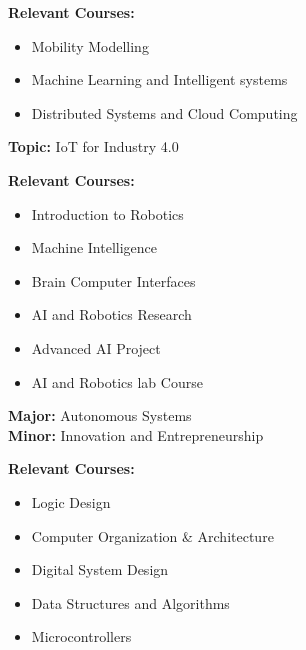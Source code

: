 
\textbf{Relevant Courses:} \begin{itemize}
    \item Mobility Modelling
    \item Machine Learning and Intelligent systems
    \item Distributed Systems and Cloud Computing
    \end{itemize}

\divider

\textbf{Topic:} IoT for Industry 4.0

\divider
{}
\textbf{Relevant Courses:} \begin{itemize}
    \item Introduction to Robotics
    \item Machine Intelligence
    \item Brain Computer Interfaces
    \item AI and Robotics Research 
    \item Advanced AI Project
    \item AI and Robotics lab Course
    \end{itemize}

\divider

\textbf{Major:} Autonomous Systems \\
\textbf{Minor:} Innovation and Entrepreneurship

\divider

\textbf{Relevant Courses:} \begin{itemize}
    \item Logic Design
    \item Computer Organization \& Architecture
    \item Digital System Design 
    \item Data Structures and Algorithms
    \item Microcontrollers
    \end{itemize}

